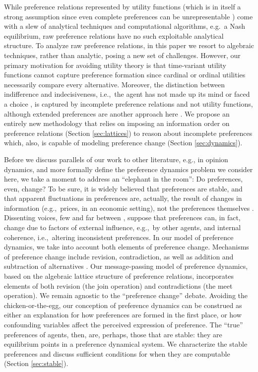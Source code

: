 \documentclass[conference]{ieeeconf}
\begin{document}
While preference relations represented by utility functions (which is in itself a strong assumption since even complete preferences can be unrepresentable \cite{Beardon2002}) come with a slew of analytical techniques and computational algorithms, e.g.~a Nash equilibrium, raw preference relations have no such exploitable analytical structure. To analyze raw preference relations, in this paper we resort to algebraic techniques, rather than analytic, posing a new set of challenges. However, our primary motivation for avoiding utility theory is that time-variant utility functions cannot capture preference formation since cardinal or ordinal utilities necessarily compare every alternative. Moreover, the distinction between indifference and indecisiveness, i.e.,~the agent has not made up its mind or faced a choice \cite{eliaz2006}, is captured by incomplete preference relations and not utility functions, although extended preferences are another approach here \cite{harsanyi1955}. We propose an entirely new methodology that relies on imposing an information order on preference relations (Section \ref{sec:lattices}) to reason about incomplete preferences which, also, is capable of modeling preference change (Section \ref{sec:dynamics}). 

Before we discuss parallels of our work to other literature, e.g., in opinion dynamics, and more formally define the preference dynamics problem we consider here, we take a moment to address an ``elephant in the room'': Do preferences, even, change? To be sure, it is widely believed that preferences are stable, and that apparent fluctuations in preferences are, actually, the result of changes in information (e.g.,~prices, in an economic setting), not the preferences themselves \cite{stigler1977}. Dissenting voices, few and far between \cite{hansen1995}, suppose that preferences can, in fact, change due to factors of external influence, e.g.,~by other agents, and internal coherence, i.e.,~altering inconsistent preferences. In our model of preference dynamics, we take into account both elements of preference change. Mechanisms of preference change include revision, contradiction, as well as addition and subtraction of alternatives \cite{hansen1995}. Our message-passing model of preference dynamics, based on the algebraic lattice structure of preference relations, incorporates elements of both revision (the join operation) and contradictions (the meet operation). We remain agnostic to the ``preference change'' debate. Avoiding the chicken-or-the-egg, our conception of preference dynamics can be construed as either an explanation for how preferences are formed in the first place, or how confounding variables affect the perceived expression of preference. The ``true'' preferences of agents, then, are, perhaps, those that are stable: they are equilibrium points in a preference dynamical system. We characterize the stable preferences and discuss sufficient conditions for when they are computable (Section \ref{sec:stable}).
\end{document}
